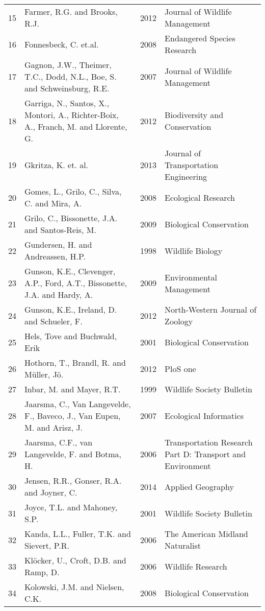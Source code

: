 \begin{longtable}[c]{p{.75cm}p{6cm}p{1.25cm}p{5.5cm}}
   15 & Farmer, R.G. and Brooks, R.J. & 2012 & Journal of Wildlife Management \\ 
   16 & Fonnesbeck, C. et.al. & 2008 & Endangered Species Research \\ 
   17 & Gagnon, J.W., Theimer, T.C., Dodd, N.L., Boe, S. and Schweinsburg, R.E. & 2007 & Journal of Wildlife Management \\ 
   18 & Garriga, N., Santos, X., Montori, A., Richter-Boix, A., Franch, M. and Llorente, G. & 2012 & Biodiversity and Conservation \\ 
   19 & Gkritza, K. et. al. & 2013 & Journal of Transportation Engineering \\ 
   20 & Gomes, L., Grilo, C., Silva, C. and Mira, A. & 2008 & Ecological Research \\ 
   21 & Grilo, C., Bissonette, J.A. and Santos-Reis, M. & 2009 & Biological Conservation \\ 
   22 & Gundersen, H. and Andreassen, H.P. & 1998 & Wildlife Biology \\ 
   23 & Gunson, K.E., Clevenger, A.P., Ford, A.T., Bissonette, J.A. and Hardy, A. & 2009 & Environmental Management \\ 
   24 & Gunson, K.E., Ireland, D. and Schueler, F. & 2012 & North-Western Journal of Zoology \\ 
   25 & Hels, Tove and Buchwald, Erik & 2001 & Biological Conservation \\ 
   26 & Hothorn, T., Brandl, R. and Müller, Jö. & 2012 & PloS one \\ 
   27 & Inbar, M. and Mayer, R.T. & 1999 & Wildlife Society Bulletin \\ 
   28 & Jaarsma, C., Van Langevelde, F., Baveco, J., Van Eupen, M. and Arisz, J. & 2007 & Ecological Informatics \\ 
   29 & Jaarsma, C.F., van Langevelde, F. and Botma, H. & 2006 & Transportation Research Part D: Transport and Environment  \\ 
   30 & Jensen, R.R., Gonser, R.A. and Joyner, C. & 2014 & Applied Geography \\ 
   31 & Joyce, T.L. and Mahoney, S.P. & 2001 & Wildlife Society Bulletin \\ 
   32 & Kanda, L.L., Fuller, T.K. and Sievert, P.R. & 2006 & The American Midland Naturalist \\ 
   33 & Klöcker, U., Croft, D.B. and Ramp, D. & 2006 & Wildlife Research \\ 
   34 & Kolowski, J.M. and Nielsen, C.K. & 2008 & Biological Conservation  \\ 

\end{longtable}

